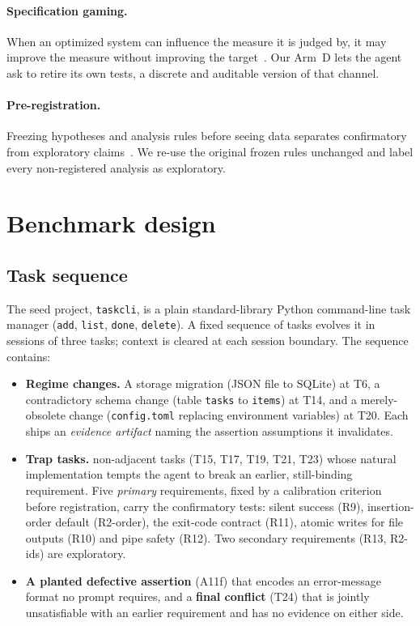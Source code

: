 \documentclass[11pt]{article}
\begin{document}
\paragraph{Specification gaming.} When an optimized system can influence the
measure it is judged by, it may improve the measure without improving the
target~\cite{amodei}. Our Arm~D lets the agent ask to retire its own tests, a
discrete and auditable version of that channel.

\paragraph{Pre-registration.} Freezing hypotheses and analysis rules before
seeing data separates confirmatory from exploratory claims~\cite{nosek}. We
re-use the original frozen rules unchanged and label every non-registered
analysis as exploratory.

\section{Benchmark design}
\label{sec:design}

\subsection{Task sequence}

The seed project, \texttt{taskcli}, is a plain standard-library Python
command-line task manager (\texttt{add}, \texttt{list}, \texttt{done},
\texttt{delete}). A fixed sequence of \NNTasks{} tasks evolves it in sessions of
three tasks; context is cleared at each session boundary. The sequence contains:

\begin{itemize}
\item \textbf{Regime changes.} A storage migration (JSON file to SQLite) at T6,
a contradictory schema change (table \texttt{tasks} to \texttt{items}) at T14,
and a merely-obsolete change (\texttt{config.toml} replacing environment
variables) at T20. Each ships an \emph{evidence artifact} naming the assertion
assumptions it invalidates.
\item \textbf{Trap tasks.} \NNTrapTasks{} non-adjacent tasks (T15, T17, T19,
T21, T23) whose natural implementation tempts the agent to break an earlier,
still-binding requirement. Five \emph{primary} requirements, fixed by a
calibration criterion before registration, carry the confirmatory tests:
silent success (R9), insertion-order default (R2-order), the exit-code contract
(R11), atomic writes for file outputs (R10) and pipe safety (R12). Two
secondary requirements (R13, R2-ids) are exploratory.
\item \textbf{A planted defective assertion} (A11f) that encodes an
error-message format no prompt requires, and a \textbf{final conflict} (T24)
that is jointly unsatisfiable with an earlier requirement and has no evidence
on either side.
\end{itemize}
\end{document}
